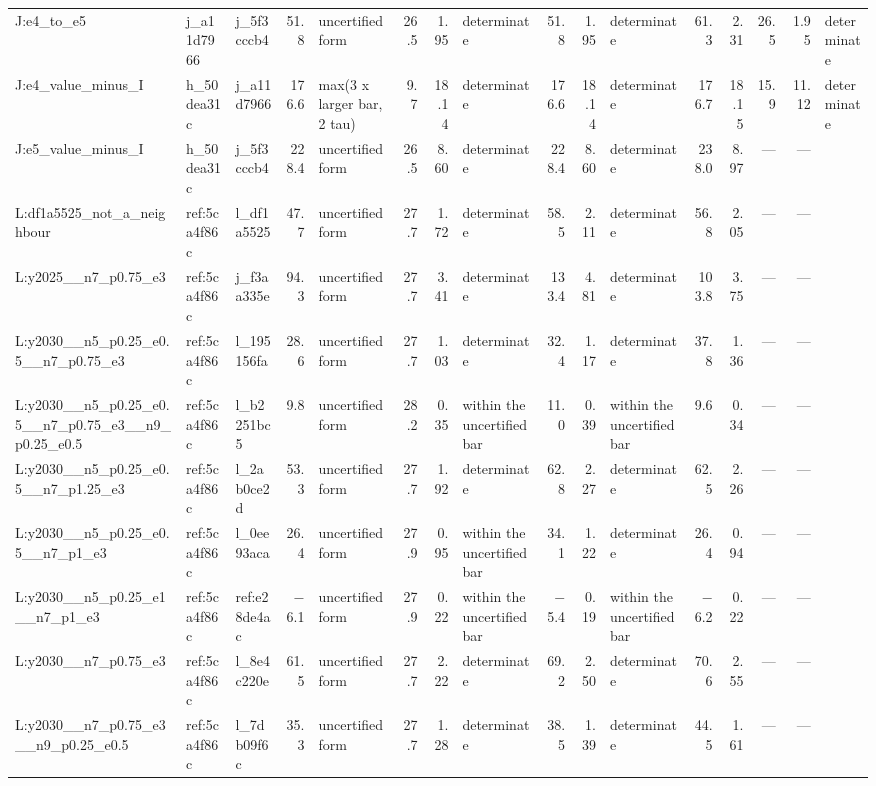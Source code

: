 \begin{table}[htbp]
\begin{tabular}{lllrlrrlrrlrrrrl}
J:e4\_to\_e5 & j\_a11d7966 & j\_5f3cccb4 & 51.8 & uncertified form & 26.5 & 1.95 & determinate & 51.8 & 1.95 & determinate & 61.3 & 2.31 & 26.5 & 1.95 & determinate \\
J:e4\_value\_minus\_I & h\_50dea31c & j\_a11d7966 & 176.6 & max(3 x larger bar, 2 tau) & 9.7 & 18.14 & determinate & 176.6 & 18.14 & determinate & 176.7 & 18.15 & 15.9 & 11.12 & determinate \\
J:e5\_value\_minus\_I & h\_50dea31c & j\_5f3cccb4 & 228.4 & uncertified form & 26.5 & 8.60 & determinate & 228.4 & 8.60 & determinate & 238.0 & 8.97 & --- & --- &  \\
L:df1a5525\_not\_a\_neighbour & ref:5ca4f86c & l\_df1a5525 & 47.7 & uncertified form & 27.7 & 1.72 & determinate & 58.5 & 2.11 & determinate & 56.8 & 2.05 & --- & --- &  \\
L:y2025\_\_n7\_p0.75\_e3 & ref:5ca4f86c & j\_f3aa335e & 94.3 & uncertified form & 27.7 & 3.41 & determinate & 133.4 & 4.81 & determinate & 103.8 & 3.75 & --- & --- &  \\
L:y2030\_\_n5\_p0.25\_e0.5\_\_n7\_p0.75\_e3 & ref:5ca4f86c & l\_195156fa & 28.6 & uncertified form & 27.7 & 1.03 & determinate & 32.4 & 1.17 & determinate & 37.8 & 1.36 & --- & --- &  \\
L:y2030\_\_n5\_p0.25\_e0.5\_\_n7\_p0.75\_e3\_\_n9\_p0.25\_e0.5 & ref:5ca4f86c & l\_b2251bc5 & 9.8 & uncertified form & 28.2 & 0.35 & within the uncertified bar & 11.0 & 0.39 & within the uncertified bar & 9.6 & 0.34 & --- & --- &  \\
L:y2030\_\_n5\_p0.25\_e0.5\_\_n7\_p1.25\_e3 & ref:5ca4f86c & l\_2ab0ce2d & 53.3 & uncertified form & 27.7 & 1.92 & determinate & 62.8 & 2.27 & determinate & 62.5 & 2.26 & --- & --- &  \\
L:y2030\_\_n5\_p0.25\_e0.5\_\_n7\_p1\_e3 & ref:5ca4f86c & l\_0ee93aca & 26.4 & uncertified form & 27.9 & 0.95 & within the uncertified bar & 34.1 & 1.22 & determinate & 26.4 & 0.94 & --- & --- &  \\
L:y2030\_\_n5\_p0.25\_e1\_\_n7\_p1\_e3 & ref:5ca4f86c & ref:e28de4ac & $-$6.1 & uncertified form & 27.9 & 0.22 & within the uncertified bar & $-$5.4 & 0.19 & within the uncertified bar & $-$6.2 & 0.22 & --- & --- &  \\
L:y2030\_\_n7\_p0.75\_e3 & ref:5ca4f86c & l\_8e4c220e & 61.5 & uncertified form & 27.7 & 2.22 & determinate & 69.2 & 2.50 & determinate & 70.6 & 2.55 & --- & --- &  \\
L:y2030\_\_n7\_p0.75\_e3\_\_n9\_p0.25\_e0.5 & ref:5ca4f86c & l\_7db09f6c & 35.3 & uncertified form & 27.7 & 1.28 & determinate & 38.5 & 1.39 & determinate & 44.5 & 1.61 & --- & --- &  \\

\end{tabular}
\end{table}
